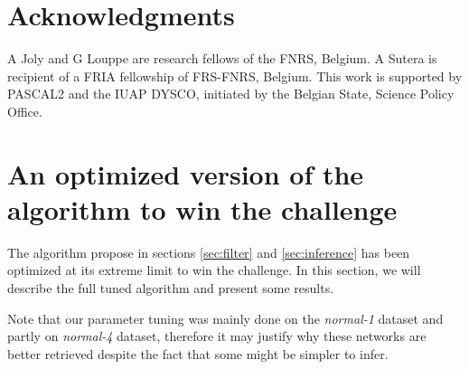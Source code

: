 \documentclass[wcp]{jmlr}
\begin{document}


\section*{Acknowledgments}
A Joly and G Louppe are research fellows of the FNRS, Belgium.  A Sutera is
recipient of a FRIA fellowship of FRS-FNRS, Belgium. This work is supported by
PASCAL2 and the IUAP DYSCO, initiated by the Belgian State, Science Policy
Office.



\newpage
\clearpage



\newpage
\clearpage

\appendix


\section{An optimized version of the algorithm to win the challenge}
\label{app:optimized}


The algorithm propose in sections \ref{sec:filter} and \ref{sec:inference} has been optimized at its extreme limit to win the challenge. In this section, we will describe the full tuned algorithm and present some results.

Note that our parameter tuning was mainly
done on the \textit{normal-1} dataset and partly on \textit{normal-4} dataset,
therefore it may justify why these networks are better retrieved despite the
fact that some might be simpler to infer.
\end{document}
